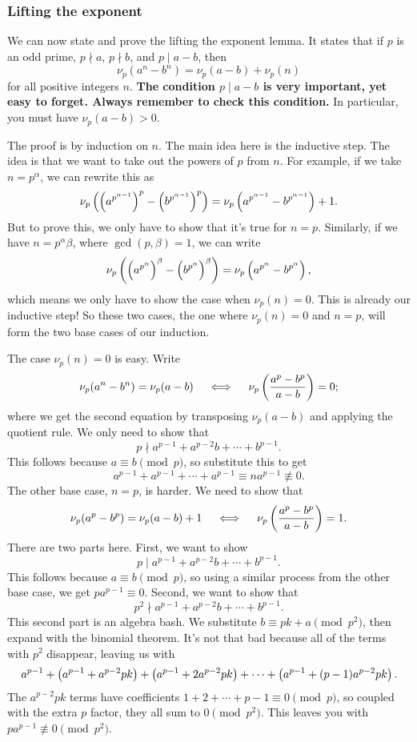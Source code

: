 \documentclass[11pt,paper=letter]{scrartcl}
\begin{document}
\subsubsection*{Lifting the exponent}

We can now state and prove the lifting the exponent lemma. It states that if $p$ is an odd prime, $p \nmid a$, $p \nmid b$, and $p \mid a - b$, then
$$\nu_p(a^n - b^n) = \nu_p(a - b) + \nu_p(n)$$
for all positive integers $n$. \textbf{The condition $p \mid a - b$ is very important, yet easy to forget. Always remember to check this condition.} In particular, you must have $\nu_p(a - b) > 0$.

The proof is by induction on $n$. The main idea here is the inductive step. The idea is that we want to take out the powers of $p$ from $n$. For example, if we take $n = p^{\alpha}$, we can rewrite this as
$$\nu_p\left(  \left( a^{p^{\alpha-1}} \right)^p - \left( b^{p^{\alpha-1}} \right)^p  \right) = \nu_p\left( a^{p^{\alpha-1}} - b^{p^{\alpha-1}} \right) + 1.$$
But to prove this, we only have to show that it's true for $n = p$. Similarly, if we have $n = p^{\alpha}\beta$, where $\gcd(p, \beta) = 1$, we can write
$$\nu_p\left( \left( a^{p^{\alpha}} \right)^\beta - \left( b^{p^{\alpha}} \right)^\beta \right) = \nu_p\left( a^{p^\alpha} - b^{p^\alpha} \right),$$
which means we only have to show the case when $\nu_p(n) = 0$. This is already our inductive step! So these two cases, the one where $\nu_p(n) = 0$ and $n = p$, will form the two base cases of our induction.

The case $\nu_p(n) = 0$ is easy. Write
$$\nu_p(a^n - b^n) = \nu_p(a - b) \quad \iff \quad \nu_p\left( \frac{a^p - b^p}{a - b} \right) = 0;$$
where we get the second equation by transposing $\nu_p(a - b)$ and applying the quotient rule. We only need to show that 
$$p \nmid a^{p-1} + a^{p-2}b + \cdots + b^{p-1}.$$
This follows because $a \equiv b \pmod p$, so substitute this to get $$a^{p-1} + a^{p-1} + \cdots + a^{p-1} \equiv n a^{p-1} \not\equiv 0.$$
The other base case, $n = p$, is harder. We need to show that
$$\nu_p(a^p - b^p) = \nu_p(a - b) + 1 \quad \iff \quad \nu_p\left( \frac{a^p - b^p}{a - b} \right) = 1.$$
There are two parts here. First, we want to show
$$p \mid a^{p-1} + a^{p-2}b + \cdots + b^{p-1}.$$
This follows because $a \equiv b \pmod p$, so using a similar process from the other base case, we get $pa^{p-1} \equiv 0$. Second, we want to show that
$$p^2 \nmid a^{p-1} + a^{p-2}b + \cdots + b^{p-1}.$$
This second part is an algebra bash. We substitute $b \equiv pk + a \pmod{p^2}$, then expand with the binomial theorem. It's not that bad because all of the terms with $p^2$ disappear, leaving us with
$$a^{p-1} + \left( a^{p-1} + a^{p-2}pk \right) + \left( a^{p-1} + 2a^{p-2}pk \right) + \cdots + \left( a^{p-1} + (p-1)a^{p-2}pk \right).$$
The $a^{p-2}pk$ terms have coefficients $1 + 2 + \cdots + p-1 \equiv 0 \pmod p$, so coupled with the extra $p$ factor, they all sum to $0 \pmod p^2$. This leaves you with $pa^{p-1} \not\equiv 0 \pmod{p^2}$.
\end{document}
